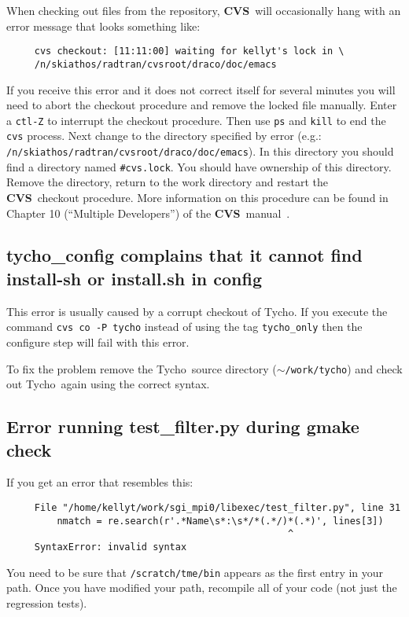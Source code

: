\documentclass[11pt]{nmemo}
\newcommand{\comp}[1]{\normalfont\normalsize\texttt{#1}}
\newcommand{\tycho}{{\normalfont\sffamily Tycho}}
\newcommand{\cvs}{{\normalfont\bfseries CVS}}
\begin{document}
When checking out files from the repository, \cvs\ will occasionally
hang with an error message that looks something like:
\begin{verbatim}
     cvs checkout: [11:11:00] waiting for kellyt's lock in \
     /n/skiathos/radtran/cvsroot/draco/doc/emacs
\end{verbatim}
If you receive this error and it does not correct itself for several
minutes you will need to abort the checkout procedure and remove the
locked file manually.  Enter a \comp{ctl-Z} to interrupt the checkout
procedure.  Then use \comp{ps} and \comp{kill} to end the \comp{cvs}
process.  Next change to the directory specified by error (e.g.:
\comp{/n/skiathos/radtran/cvsroot/draco/doc/emacs}).  In this
directory you should find a directory named \comp{\#cvs.lock}.  You
should have ownership of this directory.  Remove the directory, return
to the work directory and restart the \cvs\ checkout procedure.  More
information on this procedure can be found in Chapter 10 (``Multiple
Developers'') of the \cvs\ manual~\cite{cvs}.

\subsection{tycho\_config complains that it cannot find
  install-sh or install.sh in config}

This error is usually caused by a corrupt checkout of \tycho.  If you
execute the command \comp{cvs~co~-P~tycho} instead of using the tag
\comp{tycho\_only} then the configure step will fail with this error.  

To fix the problem remove the \tycho\ source directory
(\comp{$\sim$/work/tycho}) and check out \tycho\ again using the
correct syntax.

\subsection{Error running test\_filter.py during gmake check}

If you get an error that resembles this:
\begin{verbatim}
     File "/home/kellyt/work/sgi_mpi0/libexec/test_filter.py", line 31
         nmatch = re.search(r'.*Name\s*:\s*/*(.*/)*(.*)', lines[3])
                                                  ^
     SyntaxError: invalid syntax
\end{verbatim}
You need to be sure that \comp{/scratch/tme/bin} appears as the first
entry in your path.  Once you have modified your path, recompile all
of your code (not just the regression tests).
\end{document}
